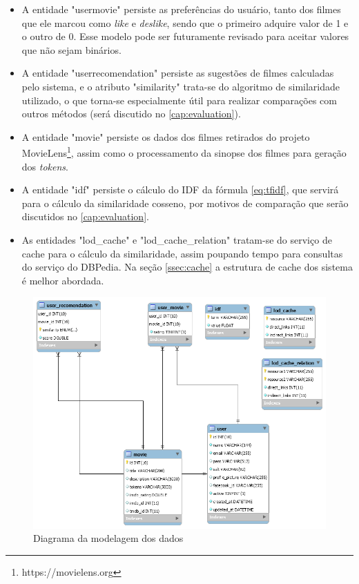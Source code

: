 \begin{itemize}
	\item{A entidade "user\textunderscore movie" persiste as preferências do usuário, tanto dos filmes que ele marcou como \textit{like} e \textit{deslike}, sendo que o primeiro adquire valor de 1 e o outro de 0. Esse modelo pode ser futuramente revisado para aceitar valores que não sejam binários.}
	
	\item{A entidade "user\textunderscore recomendation" persiste as sugestões de filmes calculadas pelo sistema, e o atributo "similarity" trata-se do algoritmo de similaridade utilizado, o que torna-se especialmente útil para realizar comparações com outros métodos (será discutido no \ref{cap:evaluation}).}
	
	\item{A entidade "movie" persiste os dados dos filmes retirados do projeto MovieLens\footnote{https://movielens.org}, assim como o processamento da sinopse dos filmes para geração dos \textit{tokens}.}
	
	\item{A entidade "idf" persiste o cálculo do \ac{IDF} da fórmula \ref{eq:tfidf}, que servirá para o cálculo da similaridade cosseno, por motivos de comparação que serão discutidos no \ref{cap:evaluation}.}
	
	\item{As entidades "lod\_cache" e "lod\_cache\_relation" tratam-se do serviço de cache para o cálculo da similaridade, assim poupando tempo para consultas do serviço do DBPedia. Na seção \ref{ssec:cache} a estrutura de cache dos sistema é melhor abordada.}
\end{itemize}

\begin{figure}
	\centering
	\includegraphics[scale=0.5]{imagens/user_model.png}
	\caption{Diagrama da modelagem dos dados}
	\label{fig:user_model}
\end{figure}
\label{ssec:dataModel}

